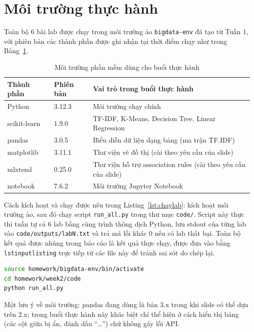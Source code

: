 \documentclass[12pt,a4paper,oneside]{article}
\begin{document}
\section{Môi trường thực hành}

Toàn bộ 6 bài lab được chạy trong môi trường ảo \texttt{bigdata-env} đã tạo từ Tuần 1, với phiên bản các thành phần được ghi nhận tại thời điểm chạy như trong Bảng~\ref{tab:env}.

\begin{table}[H]
\centering
\caption{Môi trường phần mềm dùng cho buổi thực hành}
\label{tab:env}
\begin{tabularx}{\textwidth}{l l X}
\toprule
Thành phần & Phiên bản & Vai trò trong buổi thực hành \\
\midrule
Python & 3.12.3 & Môi trường chạy chính \\
scikit-learn & 1.9.0 & TF-IDF, K-Means, Decision Tree, Linear Regression \\
pandas & 3.0.5 & Biểu diễn dữ liệu dạng bảng (ma trận TF.IDF) \\
matplotlib & 3.11.1 & Thư viện vẽ đồ thị (cài theo yêu cầu của slide) \\
mlxtend & 0.25.0 & Thư viện hỗ trợ association rules (cài theo yêu cầu của slide) \\
notebook & 7.6.2 & Môi trường Jupyter Notebook \\
\bottomrule
\end{tabularx}
\end{table}

Cách kích hoạt và chạy được nêu trong Listing~\ref{lst:chaylab}: kích hoạt môi trường ảo, sau đó chạy script \texttt{run\_all.py} trong thư mục \texttt{code/}. Script này thực thi tuần tự cả 6 lab bằng cùng trình thông dịch Python, lưu stdout của từng lab vào \texttt{code/outputs/labN.txt} và trả mã lỗi khác 0 nếu có lab thất bại. Toàn bộ kết quả được nhúng trong báo cáo là kết quả thực chạy, được đưa vào bằng \texttt{lstinputlisting} trực tiếp từ các file này để tránh sai sót do chép lại.

\begin{lstlisting}[language=bash, caption={Lệnh kích hoạt môi trường và chạy toàn bộ lab}, label={lst:chaylab}]
source homework/bigdata-env/bin/activate
cd homework/week2/code
python run_all.py
\end{lstlisting}

Một lưu ý về môi trường: pandas đang dùng là bản 3.x trong khi slide có thể dựa trên 2.x; trong buổi thực hành này khác biệt chỉ thể hiện ở cách hiển thị bảng (các cột giữa bị ẩn, đánh dấu ``\ldots'') chứ không gây lỗi API.
\end{document}
